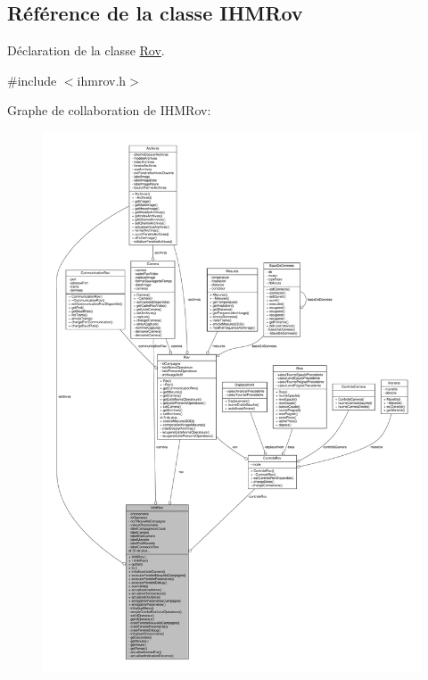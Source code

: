 \hypertarget{class_i_h_m_rov}{}\subsection{Référence de la classe I\+H\+M\+Rov}
\label{class_i_h_m_rov}


Déclaration de la classe \hyperlink{class_rov}{Rov}.  




{\ttfamily \#include $<$ihmrov.\+h$>$}



Graphe de collaboration de I\+H\+M\+Rov\+:
\nopagebreak
\begin{figure}[H]
\begin{center}
\leavevmode
\includegraphics[width=350pt]{class_i_h_m_rov__coll__graph}
\end{center}
\end{figure}

